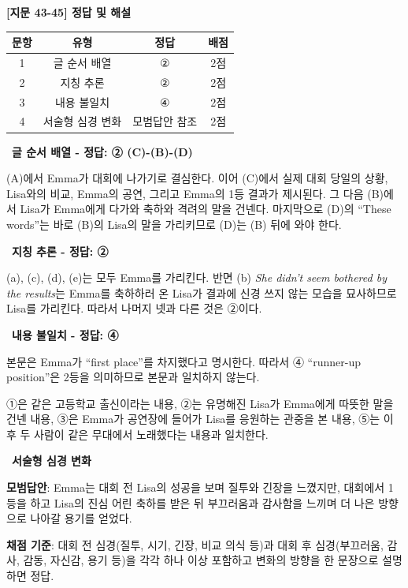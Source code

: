 \documentclass[11pt,a4paper]{article}
\newcommand{\qno}[1]{\par\vspace{10pt}{\sffamily\bfseries #1.}\ }
\begin{document}
\begin{center}
{\fontsize{15}{17}\selectfont\sffamily\bfseries [지문 43-45] 정답 및 해설}
\end{center}
\vspace{6pt}
\begin{center}
\renewcommand{\arraystretch}{1.35}
\begin{tabular}{cccc}
\toprule
문항 & 유형 & 정답 & 배점 \\
\midrule
1 & 글 순서 배열 & ② & 2점 \\
2 & 지칭 추론 & ② & 2점 \\
3 & 내용 불일치 & ④ & 2점 \\
4 & 서술형 심경 변화 & 모범답안 참조 & 2점 \\
\bottomrule
\end{tabular}
\end{center}

\qno{1}\textbf{글 순서 배열 - 정답: ② (C)-(B)-(D)}
\begin{pbox}
(A)에서 Emma가 대회에 나가기로 결심한다. 이어 (C)에서 실제 대회 당일의 상황, Lisa와의 비교, Emma의 공연, 그리고 Emma의 1등 결과가 제시된다. 그 다음 (B)에서 Lisa가 Emma에게 다가와 축하와 격려의 말을 건넨다. 마지막으로 (D)의 ``These words''는 바로 (B)의 Lisa의 말을 가리키므로 (D)는 (B) 뒤에 와야 한다.
\end{pbox}

\qno{2}\textbf{지칭 추론 - 정답: ②}
\begin{pbox}
(a), (c), (d), (e)는 모두 Emma를 가리킨다. 반면 (b) \textit{She didn't seem bothered by the results}는 Emma를 축하하러 온 Lisa가 결과에 신경 쓰지 않는 모습을 묘사하므로 Lisa를 가리킨다. 따라서 나머지 넷과 다른 것은 ②이다.
\end{pbox}

\qno{3}\textbf{내용 불일치 - 정답: ④}
\begin{pbox}
본문은 Emma가 ``first place''를 차지했다고 명시한다. 따라서 ④ ``runner-up position''은 2등을 의미하므로 본문과 일치하지 않는다.

\medskip
①은 같은 고등학교 출신이라는 내용, ②는 유명해진 Lisa가 Emma에게 따뜻한 말을 건넨 내용, ③은 Emma가 공연장에 들어가 Lisa를 응원하는 관중을 본 내용, ⑤는 이후 두 사람이 같은 무대에서 노래했다는 내용과 일치한다.
\end{pbox}

\qno{4}\textbf{서술형 심경 변화}
\begin{pbox}
\textbf{모범답안}: Emma는 대회 전 Lisa의 성공을 보며 질투와 긴장을 느꼈지만, 대회에서 1등을 하고 Lisa의 진심 어린 축하를 받은 뒤 부끄러움과 감사함을 느끼며 더 나은 방향으로 나아갈 용기를 얻었다.

\medskip
\textbf{채점 기준}: 대회 전 심경(질투, 시기, 긴장, 비교 의식 등)과 대회 후 심경(부끄러움, 감사, 감동, 자신감, 용기 등)을 각각 하나 이상 포함하고 변화의 방향을 한 문장으로 설명하면 정답.
\end{pbox}
\end{document}
